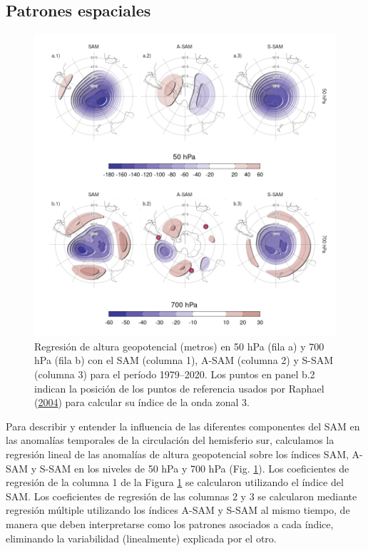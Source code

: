 \documentclass[12pt,oneside,a4paper]{reedthesis}
\begin{document}
\hypertarget{spatial}{%
\subsection{Patrones espaciales}\label{spatial}}



\begin{figure}

{\centering \includegraphics{figures/30-sam/2d-regr-1} 

}

\caption{Regresión de altura geopotencial (metros) en 50 hPa (fila a) y 700 hPa (fila b) con el SAM (columna 1), A-SAM (columna 2) y S-SAM (columna 3) para el período 1979--2020. Los puntos en panel b.2 indican la posición de los puntos de referencia usados por Raphael (\protect\hyperlink{ref-raphael2004}{2004}) para calcular su índice de la onda zonal 3.}\label{fig:2d-regr}
\end{figure}

Para describir y entender la influencia de las diferentes componentes del SAM en las anomalías temporales de la circulación del hemisferio sur, calculamos la regresión lineal de las anomalías de altura geopotencial sobre los índices SAM, A-SAM y S-SAM en los niveles de 50 hPa y 700 hPa (Fig. \ref{fig:2d-regr}).
Los coeficientes de regresión de la columna 1 de la Figura \ref{fig:2d-regr} se calcularon utilizando el índice del SAM.
Los coeficientes de regresión de las columnas 2 y 3 se calcularon mediante regresión múltiple utilizando los índices A-SAM y S-SAM al mismo tiempo, de manera que deben interpretarse como los patrones asociados a cada índice, eliminando la variabilidad (linealmente) explicada por el otro.
\end{document}
